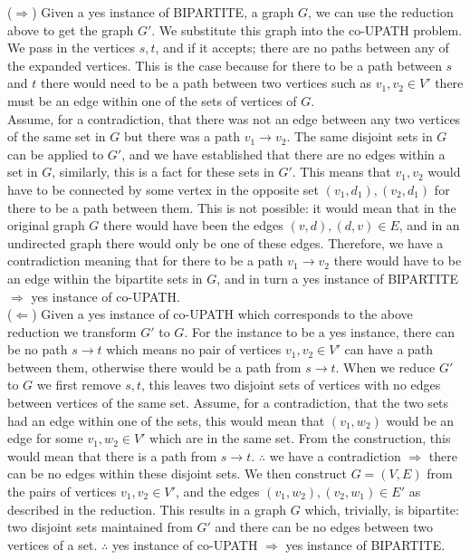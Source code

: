 \documentclass[12pt]{article}
\begin{document}
\begin{enumerate}
\begin{enumerate}
($\Rightarrow $) Given a yes instance of BIPARTITE, a graph $G$, we can use the reduction above to get the graph $G'$. We substitute this graph into the co-UPATH problem. We pass in the vertices $s,t$, and if it accepts; there are no paths between any of the expanded vertices. This is the case because for there to be a path between $s$ and $t$ there would need to be a path between two vertices such as $v_1,v_2 \in V'$ there must be an edge within one of the sets of vertices of $G$. \\Assume, for a contradiction, that there was not an edge between any two vertices of the same set in $G$ but there was a path $v_1\rightarrow v_2$. The same disjoint sets in $G$ can be applied to $G'$, and we have established that there are no edges within a set in $G$, similarly, this is a fact for these sets in $G'$. This means that $v_1,v_2$ would have to be connected by some vertex in the opposite set $(v_1,d_1),(v_2,d_1)$ for there to be a path between them. This is not possible: it would mean that in the original graph $G$ there would have been the edges $(v,d),(d,v)\in E$, and in an undirected graph there would only be one of these edges. Therefore, we have a contradiction meaning that for there to be a path $v_1\rightarrow v_2$ there would have to be an edge within the bipartite sets in $G$, and in turn a yes instance of BIPARTITE $\Rightarrow $ yes instance of co-UPATH. \\
($\Leftarrow $) Given a yes instance of co-UPATH which corresponds to the above reduction we transform $G'$ to $G$. For the instance to be a yes instance, there can be no path $s\rightarrow t$ which means no pair of vertices $v_1,v_2 \in V'$ can have a path between them, otherwise there would be a path from $s\rightarrow t$. When we reduce $G'$ to $G$ we first remove $s,t$, this leaves two disjoint sets of vertices with no edges between vertices of the same set. Assume, for a contradiction, that the two sets had an edge within one of the sets, this would mean that $(v_1,w_2)$ would be an edge for some $v_1,w_2 \in V'$ which are in the same set. From the construction, this would mean that there is a path from $s\rightarrow t$. $\therefore $ we have a contradiction $\Rightarrow $ there can be no edges within these disjoint sets. We then construct $G=(V,E) $ from the pairs of vertices $v_1,v_2 \in V'$, and the edges $(v_1,w_2),(v_2,w_1) \in E'$ as described in the reduction. This results in a graph $G$ which, trivially, is bipartite: two disjoint sets maintained from $G'$ and there can be no edges between two vertices of a set. $\therefore $ yes instance of co-UPATH $\Rightarrow $ yes instance of BIPARTITE. \\

\end{enumerate}
\end{enumerate}
\end{document}

